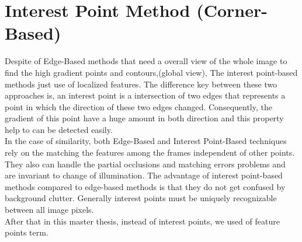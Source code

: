 \section{Interest Point Method (Corner-Based)}
Despite of Edge-Based methods that need a overall view of the whole image to find the high gradient points and contours,(global view), The interest point-based methods just use of localized features. The difference key between these two approaches is, an interest point is a intersection of two edges that represents a point in which the direction of these two edges changed. Consequently, the gradient of this point have a huge amount in both direction and this property help to can be detected easily.\\
In the case of similarity, both Edge-Based and Interest Point-Based techniques rely on the matching the features among the frames independent of other points. They also can handle the partial occlusions and matching errors problems and are invariant to change of illumination. The advantage of interest point-based methods compared to edge-based methods is that they do not get confused by background clutter. Generally interest points must be uniquely recognizable between all image pixels.\\
After that in this master thesis, instead of interest points, we used of feature points term.

